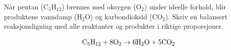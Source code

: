 

Når pentan (C$_{5}$H$_{12}$) brennes med oksygen (O$_{2}$) under ideelle forhold, blir produktene vanndamp (H$_{2}$O) og karbondioksid (CO$_{2}$). Skriv en balansert reaksjonsligning med alle reaktanter og produkter i riktige proporsjoner.







$$\hbox{C}_5\hbox{H}_{12} + \hbox{8O}_2 \to \hbox{6H}_2\hbox{O} + \hbox{5CO}_2$$










